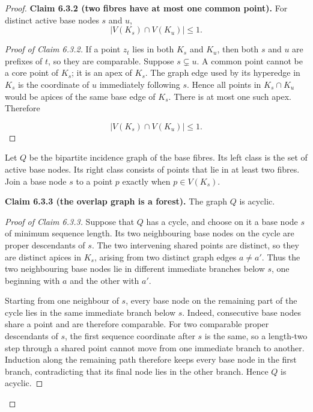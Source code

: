 \documentclass[a4paper,11pt,reqno]{amsart}
\theoremstyle{plain}
\theoremstyle{definition}
\theoremstyle{remark}
\begin{document}
\begin{proof}
\medskip
\noindent\textbf{Claim 6.3.2 (two fibres have at most one common point).}
For distinct active base nodes \(s\) and \(u\),
\[
|V(K_s)\cap V(K_u)|\le 1.
\]

\smallskip
\begin{proof}[Proof of Claim 6.3.2]
If a point \(z_t\) lies in both \(K_s\) and \(K_u\), then both \(s\) and
\(u\) are prefixes of \(t\), so they are comparable. Suppose
\(s\subsetneq u\). A common point cannot be a core point of \(K_s\); it is
an apex of \(K_s\). The graph edge used by its hyperedge in \(K_s\) is the
coordinate of \(u\) immediately following \(s\). Hence all points in
\(K_s\cap K_u\) would be apices of the same base edge of \(K_s\). There is
at most one such apex. Therefore

\[
|V(K_s)\cap V(K_u)|\le1. \tag{6.2}
\]
\end{proof}

Let \(Q\) be the bipartite incidence graph of the base fibres. Its left
class is the set of active base nodes. Its right class consists of points
that lie in at least two fibres. Join a base node \(s\) to a point \(p\)
exactly when \(p\in V(K_s)\).

\medskip
\noindent\textbf{Claim 6.3.3 (the overlap graph is a forest).}
The graph \(Q\) is acyclic.

\smallskip
\begin{proof}[Proof of Claim 6.3.3]
Suppose that \(Q\) has a cycle, and choose on it a base node \(s\) of
minimum sequence length. Its two neighbouring base nodes on the cycle are
proper descendants of \(s\). The two intervening shared points are distinct,
so they are distinct apices in \(K_s\), arising from two distinct graph edges
\(a\ne a'\). Thus the two neighbouring base nodes lie in different immediate
branches below \(s\), one beginning with \(a\) and the other with \(a'\).

Starting from one neighbour of \(s\), every base node on the remaining
part of the cycle lies in the same immediate branch below \(s\). Indeed,
consecutive base nodes share a point and are therefore comparable. For two
comparable proper descendants of \(s\), the first sequence coordinate after
\(s\) is the same, so a length-two step through a shared point cannot move
from one immediate branch to another. Induction along the remaining path
therefore keeps every base node in the first branch, contradicting that its
final node lies in the other branch. Hence \(Q\) is acyclic.
\end{proof}


\end{proof}
\end{document}
